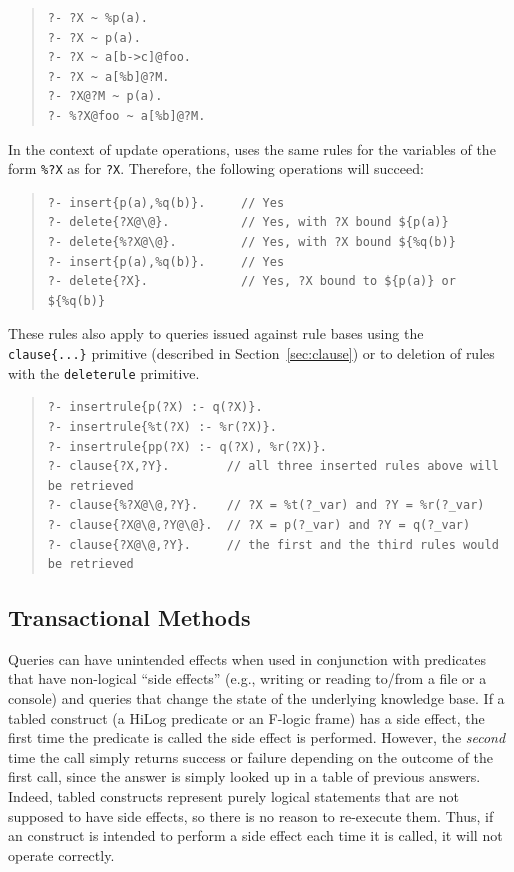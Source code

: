 \documentclass[11pt]{article}
\newcommand{\ERGO}{\mbox{\smaller{\ensuremath{\cal{E}}\smaller{{\sc{RGO}}}}}\xspace}
\newcommand{\FLSYSTEM}{\ERGO}
\begin{document}
\begin{quote}
\begin{verbatim}
?- ?X ~ %p(a).      
?- ?X ~ p(a).         
?- ?X ~ a[b->c]@foo.  
?- ?X ~ a[%b]@?M.      
?- ?X@?M ~ p(a).     
?- %?X@foo ~ a[%b]@?M.
\end{verbatim}
\end{quote}

In the context of update operations, \FLSYSTEM uses the same rules for
the variables of the form {\tt \%?X} as for {\tt ?X}. Therefore, the
following operations will succeed:
\begin{quote}
\begin{verbatim}
?- insert{p(a),%q(b)}.     // Yes
?- delete{?X@\@}.          // Yes, with ?X bound ${p(a)}
?- delete{%?X@\@}.         // Yes, with ?X bound ${%q(b)}
?- insert{p(a),%q(b)}.     // Yes
?- delete{?X}.             // Yes, ?X bound to ${p(a)} or ${%q(b)}
\end{verbatim}
\end{quote}

These rules also apply to queries issued against rule bases using the {\tt
  clause\{...\}} primitive (described in Section~\ref{sec:clause}) or to deletion of rules with the {\tt deleterule} primitive.

\begin{quote}
\begin{verbatim}
?- insertrule{p(?X) :- q(?X)}.  
?- insertrule{%t(?X) :- %r(?X)}.
?- insertrule{pp(?X) :- q(?X), %r(?X)}.
?- clause{?X,?Y}.        // all three inserted rules above will be retrieved
?- clause{%?X@\@,?Y}.    // ?X = %t(?_var) and ?Y = %r(?_var)
?- clause{?X@\@,?Y@\@}.  // ?X = p(?_var) and ?Y = q(?_var)
?- clause{?X@\@,?Y}.     // the first and the third rules would be retrieved
\end{verbatim}
\end{quote}

\subsection{Transactional Methods}\label{sec-proc-methods}

%
Queries can
have unintended effects when used in conjunction with
predicates that have non-logical ``side effects''
(e.g., writing or reading to/from a file or a console) and queries that change the state of
the underlying knowledge base.  If a tabled construct (a HiLog predicate
or an F-logic frame)
has a side effect, the first time the
predicate is called the side effect is performed. However, the \emph{second} time the
call simply returns success or failure depending on the outcome of
the first call, since the answer is simply looked
up in a table of previous answers. Indeed, tabled constructs represent
purely logical statements that are not supposed to have side effects, so
there is no reason to re-execute them.
Thus, if an \FLSYSTEM construct
is intended to perform a side effect each time it is
called, it will not operate correctly.
\end{document}
